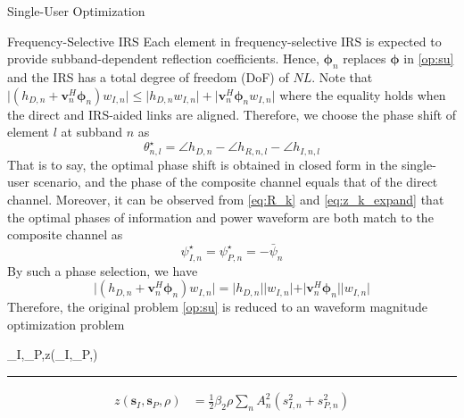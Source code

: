 \documentclass{IEEEtran}
\begin{document}
\begin{section}{Single-User Optimization}
	\begin{subsection}{Frequency-Selective IRS}
		Each element in frequency-selective IRS is expected to provide subband-dependent reflection coefficients. Hence, $\boldsymbol{\phi}_n$ replaces $\boldsymbol{\phi}$ in \ref{op:su} and the IRS has a total degree of freedom (DoF) of $NL$. Note that $\lvert{(h_{D,n}+\boldsymbol{v}_n^H\boldsymbol{\phi}_n)w_{I,n}}\rvert \le \lvert{h_{D,n}w_{I,n}}\rvert+\lvert{\boldsymbol{v}_n^H\boldsymbol{\phi}_n w_{I,n}}\rvert$ where the equality holds when the direct and IRS-aided links are aligned. Therefore, we choose the phase shift of element $l$ at subband $n$ as
		\begin{equation}\label{eq:theta}
			\theta_{n,l}^\star = \angle{h}_{D,n} - \angle{h_{R,n,l}}-\angle{h_{I,n,l}}
		\end{equation}
		That is to say, the optimal phase shift is obtained in closed form in the single-user scenario, and the phase of the composite channel equals that of the direct channel. Moreover, it can be observed from \ref{eq:R_k} and \ref{eq:z_k_expand} that the optimal phases of information and power waveform are both match to the composite channel as
		\begin{equation}\label{eq:psi}
			\psi_{I,n}^{\star}=\psi_{P,n}^{\star}=-\bar{\psi}_{n}
		\end{equation}
		By such a phase selection, we have
		\begin{equation}
			\lvert{(h_{D,n}+\boldsymbol{v}_n^H\boldsymbol{\phi}_n)w_{I,n}}\rvert = \lvert h_{D,n} \rvert \lvert w_{I,n} \rvert + \vert \boldsymbol{v}_n^H\boldsymbol{\phi}_n \rvert \lvert w_{I,n} \rvert
		\end{equation}
		Therefore, the original problem \ref{op:su} is reduced to an waveform magnitude optimization problem
		\begin{maxi!}
				{\boldsymbol{s}_I,_P,\rho}{z(\boldsymbol{s}_I,_P,\rho)}{\label{op:su_gp}}{}
			\end{maxi!}
		\begin{figure*}[b]
			\hrule
			\begin{equation}\label{eq:z_gp}
				\begin{split}
					z(\boldsymbol{s}_I,\boldsymbol{s}_P,\rho)
					&=\frac{1}{2}{\beta_2}{\rho}\sum_n{A_n^2(s_{I,n}^2+s_{P,n}^2)}\\

\end{split}
\end{equation}
\end{figure*}
\end{subsection}
\end{section}
\end{document}
